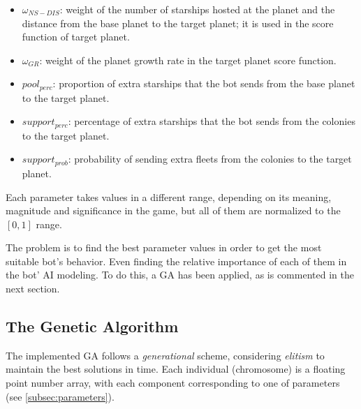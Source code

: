 \documentclass{llncs}
\begin{document}
\begin{itemize}
	\item $\omega_{NS-DIS}$: weight of the number of starships
          hosted at the planet and the distance from the base planet
          to the target planet; it is used in the score function of
          target planet. 

	\item $\omega_{GR}$: weight of the planet growth rate in the target planet score function.

	\item $pool_{perc}$: proportion of extra starships that the bot sends from the base planet to the target planet.
	
	\item $support_{perc}$: percentage of extra starships that the bot sends from the colonies to the target planet.

	\item $support_{prob}$: probability of sending extra fleets from the colonies to the target planet.

\end{itemize}

Each parameter takes values in a different range, depending on its meaning, magnitude and significance in the game, but all of them are normalized to the $[0,1]$ range.


The problem is to find the best parameter values in order to get the most suitable bot's behavior. Even finding the relative importance of each of them in the bot' AI modeling.
To do this, a GA has been applied, as is commented in the next section.


\subsection{The Genetic Algorithm}
\label{subsec:theGA}

The implemented GA follows a \textit{generational}
\cite{GAs_Michalewicz96} scheme, considering \textit{elitism} to
maintain the best solutions in time. Each individual (chromosome) is a
floating point number array, with each component corresponding to one of parameters (see \ref{subsec:parameters}). 
\end{document}
